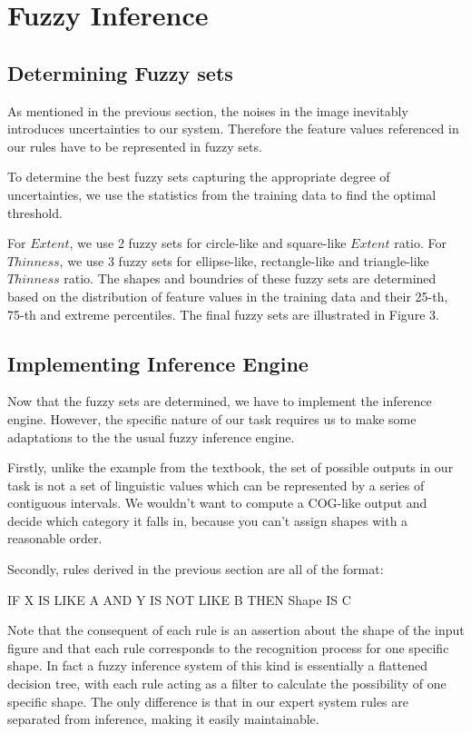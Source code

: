 \section{Fuzzy Inference}

\subsection{Determining Fuzzy sets}

As mentioned in the previous section, the noises in the image inevitably introduces uncertainties to our system. Therefore the feature values referenced in our rules have to be represented in fuzzy sets.

To determine the best fuzzy sets capturing the appropriate degree of uncertainties, we use the statistics from the training data to find the optimal threshold.

For $Extent$, we use 2 fuzzy sets for circle-like and square-like $Extent$ ratio. For $Thinness$, we use 3 fuzzy sets for ellipse-like, rectangle-like and triangle-like $Thinness$ ratio. The shapes and boundries of these fuzzy sets are determined based on the distribution of feature values in the training data and their 25-th, 75-th and extreme percentiles. The final fuzzy sets are illustrated in Figure 3.

\subsection{Implementing Inference Engine}

Now that the fuzzy sets are determined, we have to implement the inference engine. However, the specific nature of our task requires us to make some adaptations to the the usual fuzzy inference engine.

Firstly, unlike the example from the textbook, the set of possible outputs in our task is not a set of linguistic values which can be represented by a series of contiguous intervals. We wouldn't want to compute a COG-like output and decide which category it falls in, because you can't assign shapes with a reasonable order.

Secondly, rules derived in the previous section are all of the format:

IF X IS LIKE A AND Y IS NOT LIKE B THEN Shape IS C

Note that the consequent of each rule is an assertion about the shape of the input figure and that each rule corresponds to the recognition process for one specific shape. In fact a fuzzy inference system of this kind is essentially a flattened decision tree, with each rule acting as a filter to calculate the possibility of one specific shape. The only difference is that in our expert system rules are separated from inference, making it easily maintainable.

